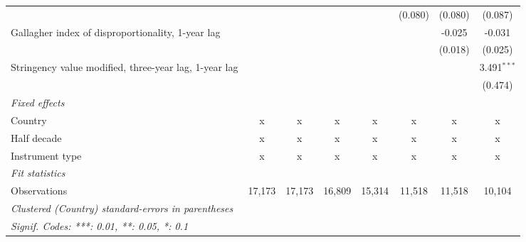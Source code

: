 \begin{table}[htbp]
\begin{tabular}{lccccccc}
                                                            &         &              &              &             & (0.080)       & (0.080)       & (0.087)\\   
      Gallagher index of disproportionality, 1-year lag     &         &              &              &             &               & -0.025        & -0.031\\   
                                                            &         &              &              &             &               & (0.018)       & (0.025)\\   
      Stringency value modified, three-year lag, 1-year lag &         &              &              &             &               &               & 3.491$^{***}$\\   
                                                            &         &              &              &             &               &               & (0.474)\\   
      \emph{Fixed effects}\\
      Country                                               & x       & x            & x            & x           & x             & x             & x\\  
      Half decade                                           & x       & x            & x            & x           & x             & x             & x\\  
      Instrument type                                       & x       & x            & x            & x           & x             & x             & x\\  
      \midrule \emph{Fit statistics}\\
      Observations                                          & 17,173  & 17,173       & 16,809       & 15,314      & 11,518        & 11,518        & 10,104\\  
      \midrule
      \multicolumn{8}{l}{\emph{Clustered (Country) standard-errors in parentheses}}\\
      \multicolumn{8}{l}{\emph{Signif. Codes: ***: 0.01, **: 0.05, *: 0.1}}\\
   \end{tabular}
\end{table}


